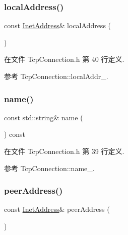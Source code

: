 \subsubsection{\texorpdfstring{local\+Address()}{localAddress()}}
{\footnotesize\ttfamily const \hyperlink{classmuduo_1_1InetAddress}{Inet\+Address}\& local\+Address (\begin{DoxyParamCaption}{ }\end{DoxyParamCaption})\hspace{0.3cm}{\ttfamily [inline]}}



在文件 Tcp\+Connection.\+h 第 40 行定义.



参考 Tcp\+Connection\+::local\+Addr\+\_\+.

\mbox{\label{classmuduo_1_1TcpConnection_ad8227ba86a01f26e4f173cd5e219d5d1}} 
\subsubsection{\texorpdfstring{name()}{name()}}
{\footnotesize\ttfamily const std\+::string\& name (\begin{DoxyParamCaption}{ }\end{DoxyParamCaption}) const\hspace{0.3cm}{\ttfamily [inline]}}



在文件 Tcp\+Connection.\+h 第 39 行定义.



参考 Tcp\+Connection\+::name\+\_\+.

\mbox{\label{classmuduo_1_1TcpConnection_a3441a3efe8170b4b9892f0ca65d21726}} 
\subsubsection{\texorpdfstring{peer\+Address()}{peerAddress()}}
{\footnotesize\ttfamily const \hyperlink{classmuduo_1_1InetAddress}{Inet\+Address}\& peer\+Address (\begin{DoxyParamCaption}{ }\end{DoxyParamCaption})\hspace{0.3cm}{\ttfamily [inline]}}



